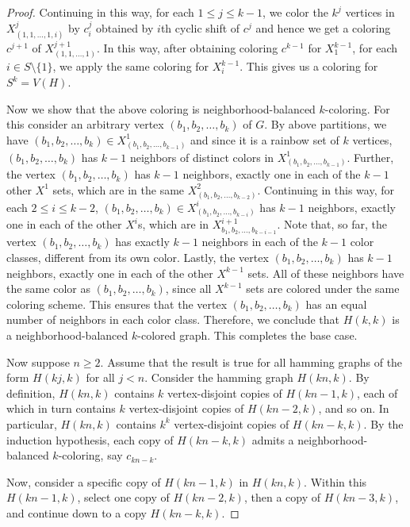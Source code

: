 \documentclass[12pt]{article}
\newcommand{\nbc}{neighborhood-balanced $k$-coloring\xspace}
\newcommand{\nbcd}{neighborhood-balanced $k$-colored\xspace}
\begin{document}
\begin{proof}
Continuing in this way, for each $1 \le j \le k-1$, we color the $k^{j}$ vertices in $X^{j}_{(1, 1, \dots, 1, i)}$ by $c^{j}_{i}$ obtained by $i$th cyclic shift of $c^{j}$ and hence we get a coloring $c^{j+1}$ of $X^{j+1}_{(1, 1, \dots, 1)}$.
In this way, after obtaining coloring $c^{k-1}$ for $X^{k-1}_{1}$, for each $i \in S \setminus \{1\}$, we apply the same coloring for $X^{k-1}_{i}$.
This gives us a coloring for $S^{k} = V(H)$.
\par
Now we show that the above coloring is \nbc.
For this consider an arbitrary vertex $(b_1, b_2, \dots, b_k)$ of $G$.
By above partitions, we have $(b_1, b_2, \dots, b_k) \in X^{1}_{(b_1, b_2,  \dots, b_{k-1})}$ and since it is a rainbow set of $k$ vertices, $(b_1, b_2,\dots, b_{k})$ has $k-1$ neighbors of distinct colors in $X^{1}_{(b_1, b_2,\dots, b_{k-1})}$.
Further, the vertex $(b_1, b_2,\dots, b_{k})$ has $k-1$ neighbors, exactly one in each of the $k-1$ other $X^1$ sets, which are in the same $X^{2}_{(b_1, b_2,\dots, b_{k-2})}$.
Continuing in this way, for each $2 \le i \le k-2$, $(b_1, b_2, \dots, b_{k}) \in X^{i}_{(b_1, b_2,\dots, b_{k-i})}$ has $k-1$ neighbors, exactly one in each of the other $X^{i}$s, which are in $X^{i+1}_{b_1, b_2,\dots, b_{k-i-1}}$.
Note that, so far, the vertex $(b_1, b_2, \dots, b_k)$ has exactly $k-1$ neighbors in each of the $k-1$ color classes, different from its own color.
Lastly, the vertex $(b_1, b_2, \dots, b_k)$ has  $k-1$ neighbors, exactly one in each of the other $X^{k-1}$ sets.
All of these neighbors have the same color as $(b_1, b_2,\dots, b_k)$, since all $X^{k-1}$ sets are colored under the same coloring scheme.
This ensures that the vertex $(b_1, b_2, \dots, b_k)$ has an equal number of neighbors in each color class.
Therefore, we conclude that $H(k,k)$ is a \nbcd graph.
This completes the base case.
\par
Now suppose $n \ge 2$.
Assume that the result is true for all hamming graphs of the form $H(kj, k)$ for all $ j < n$.
Consider the hamming graph \( H(kn, k) \).
By definition, \( H(kn, k) \) contains \( k \) vertex-disjoint copies of \( H(kn - 1, k) \), each of which in turn contains \( k \) vertex-disjoint copies of \( H(kn - 2, k) \), and so on.
In particular, \( H(kn, k) \) contains \( k^k \) vertex-disjoint copies of \( H(kn - k, k) \).
By the induction hypothesis, each copy of \( H(kn - k, k) \) admits a \nbc, say \( c_{kn-k} \).
\par
Now, consider a specific copy of \( H(kn - 1, k) \) in \( H(kn, k) \).
Within this  \( H(kn - 1, k) \), select one copy of \( H(kn  - 2, k) \), then a copy of \( H(kn - 3, k) \), and continue down to a copy \( H(kn - k, k) \).

\end{proof}
\end{document}
